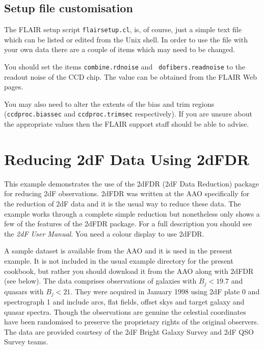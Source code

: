 \documentclass[twoside,11pt]{article}
\newcommand{\htmladdnormallink}[2]{#1}
\newcommand{\xlabel}[1]{}
\begin{document}
\subsection{\label{FLAIR_SETUP}Setup file customisation}

The FLAIR setup script {\tt flairsetup.cl}, is, of course, just
a simple text file which can be listed or edited from the Unix
shell.  In order to use the file with your own data there are
a couple of items which may need to be changed.

You should set the items {\tt combine.rdnoise} and {\tt
dofibers.readnoise} to the readout noise of the CCD chip.  The value
can be obtained from the FLAIR Web pages.

You may also need to alter the extents of the bias and trim
regions ({\tt ccdproc.biassec} and {\tt ccdproc.trimsec}
respectively).  If you are unsure about the appropriate values
then the FLAIR support staff should be able to advise.


\newpage
\section{\xlabel{2DF}\label{2DF}Reducing 2dF Data Using 2dFDR}

This example demonstrates the use of the 2dFDR (2dF Data Reduction)
package for reducing 2dF observations.  2dFDR was written at the AAO
specifically for the reduction of 2dF data and it is the usual way to
reduce these data.  The example works through a complete simple
reduction but nonetheless only shows a few of the features of the
2dFDR package.  For a full description you should see the
\htmladdnormallink{{\it 2dF User Manual}\/}
{http://www.aao.gov.au/2df/manual.html}\cite{BAILEY97}.  You need a
colour display to use 2dFDR.

A sample dataset is available from the AAO and it is used in the present
example.  It is not included in the usual example directory for the
present cookbook, but rather you should download it from the AAO along
with 2dFDR (see below).  The data comprises observations of galaxies
with $B_{j} < 19.7$ and quasars with $B_{j} < 21$.  They were acquired
in January 1998 using 2dF plate 0 and spectrograph 1 and include arcs,
flat fields, offset skys and target galaxy and quasar spectra.  Though
the observations are genuine the celestial coordinates have been
randomised to preserve the proprietary rights of the original observers.
The data are provided courtesy of the 2dF Bright Galaxy Survey and
2dF QSO Survey teams.
\end{document}
